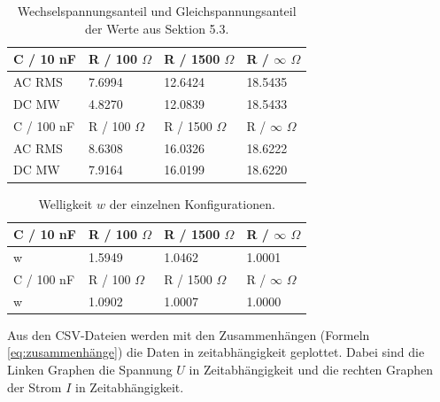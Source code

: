\documentclass[12pt,a4paper,twoside]{article}
\begin{document}
\begin{table}[H]
    \centering
    \caption{Wechselspannungsanteil und Gleichspannungsanteil der Werte aus Sektion 5.3. }
    \label{tab:AC und DC}
    \begin{tabular}{| l | l | l | l |}
        \hline
        C / 10 nF & R / 100 $\Omega$ & R / 1500 $\Omega$ & R / $\infty$ $\Omega$ \\ 
        \hline
        AC RMS & 7.6994 & 12.6424 & 18.5435  \\
        DC MW  & 4.8270 & 12.0839 & 18.5433 \\
        \hline
        \hline
        C / 100 nF & R / 100 $\Omega$ & R / 1500 $\Omega$ & R / $\infty$ $\Omega$ \\ 
        \hline
        AC RMS & 8.6308 & 16.0326 & 18.6222  \\
        DC MW  & 7.9164 & 16.0199 & 18.6220  \\
        \hline
    \end{tabular}
\end{table}

\begin{table}[H]
    \centering
    \caption{Welligkeit $w$ der einzelnen Konfigurationen.}
    \label{tab:welligkeit}
    \begin{tabular}{| l | l | l | l |}
        \hline
        C / 10 nF & R / 100 $\Omega$ & R / 1500 $\Omega$ & R / $\infty$  $\Omega$ \\ 
        \hline
        w & 1.5949 & 1.0462 & 1.0001 \\
        \hline
        \hline
        C / 100 nF & R / 100 $\Omega$ & R / 1500 $\Omega$ & R / $\infty$ $\Omega$ \\ 
        \hline
        w & 1.0902 & 1.0007 & 1.0000 \\
        \hline
    \end{tabular}
\end{table}

\noindent
Aus den CSV-Dateien werden mit den Zusammenhängen (Formeln \ref{eq:zusammenhänge}) die Daten in zeitabhängigkeit geplottet. 
Dabei sind die Linken Graphen die Spannung $U$ in Zeitabhängigkeit und die rechten Graphen der Strom $I$ in Zeitabhängigkeit. 
\end{document}
